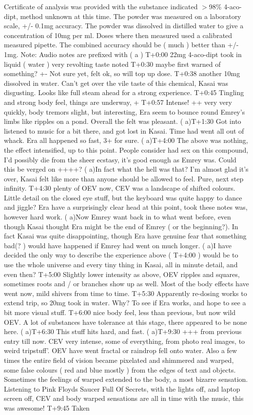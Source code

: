 \documentclass[12pt]{book}
\begin{document}
Certificate of analysis was provided with the substance indicated $>$98\% 4-aco-dipt, method unknown at this time. The powder was measured on a laboratory scale, +/- 0.1mg accuracy. The powder was dissolved in distilled water to give a concentration of 10mg per ml. Doses where then measured used a calibrated measured pipette. The combined accuracy should be ( much ) better than +/- 1mg. Note: Audio notes are prefixed with ( a ) T+0:00 22mg 4-aco-dipt took in liquid ( water ) very revolting taste noted T+0:30 maybe first warned of something? +- Not sure yet, felt ok, so will top up dose. T+0:38 another 10mg dissolved in water. Can't get over the vile taste of this chemical, Kasai was disgusting. Looks like full steam ahead for a strong experience. T+0:45 Tingling and strong body feel, things are underway, + T+0:57 Intense! ++ very very quickly, body tremors slight, but interesting, Era seem to bounce round Emrey's limbs like ripples on a pond. Overall the felt was pleasant. ( a)T+1:30 Got into listened to music for a bit there, and got lost in Kasai. Time had went all out of whack. Era all happened so fast, 3+ for sure. ( a)T+4:00 The above was nothing, the effect intensified, up to this point. People consider had sex on this compound, I'd possibly die from the sheer ecstasy, it's good enough as Emrey was. Could this be verged on ++++? ( a)In fact what the hell was that? I'm almost glad it's over, Kasai felt like more than anyone should be allowed to feel. Pure, next step infinity. T+4:30 plenty of OEV now, CEV was a landscape of shifted colours. Little detail on the closed eye stuff, but the keyboard was quite happy to dance and jiggle? Era have a surprisingly clear head at this point, took these notes was, however hard work. ( a)Now Emrey want back in to what went before, even though Kasai thought Era might be the end of Emrey ( or the beginning?). In fact Kasai was quite disappointing, though Era have genuine fear that something bad(? ) would have happened if Emrey had went on much longer. ( a)I have decided the only way to describe the experience above ( T+4:00 ) would be to use the whole universe and every tiny thing in Kasai, all in minute detail, and even then? T+5:00 Slightly lower intensity as above, OEV ripples and squares, sometimes roots and / or branches show up as well. Most of the body effects have went now, mild shivers from time to time. T+5:30 Apparently re-dosing works to extend trip, so 20mg took in water. Why? To see if Era works, and hope to see a bit more visual stuff. T+6:00 nice body feel, less than previous, but now wild OEV. A lot of substances have tolerance at this stage, there appeared to be none here. ( a)T+6:30 This stuff hits hard, and fast. ( a)T+9:30 +++ from previous entry till now. CEV very intense, some of everything, from photo real images, to weird tripstuff'. OEV have went fractal or raindrop fell onto water. Also a few times the entire field of vision became pixelated and shimmered and warped, some false colours ( red and blue mostly ) from the edges of text and objects. Sometimes the feelings of warped extended to the body, a most bizarre sensation. Listening to Pink Floyds Saucer Full Of Secrets, with the lights off, and laptop screen off, CEV and body warped sensations are all in time with the music, this was awesome! T+9:45 Taken 
\end{document}

